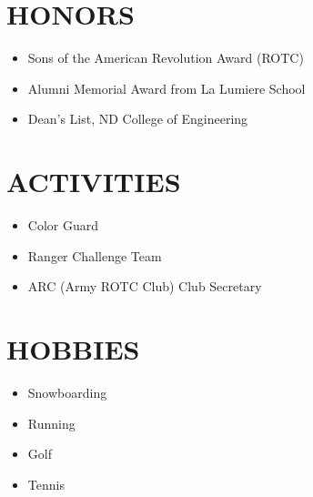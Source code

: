 \documentclass[11pt]{res} %
\begin{document}
\begin{resume}
\section{HONORS} 
 
\begin{itemize} \itemsep -2pt
	\item Sons of the American Revolution Award (ROTC) 
	\item Alumni Memorial Award from La Lumiere School
	\item Dean's List, ND College of Engineering
	
\end{itemize}
\section{ACTIVITIES} 
\begin{itemize} \itemsep -2pt
	\item Color Guard
	\item Ranger Challenge Team 
	\item ARC (Army ROTC Club) Club Secretary 
\end{itemize}
\section{HOBBIES} 
 \begin{itemize} \itemsep -2pt
	\item Snowboarding
	\item Running
	\item Golf
	\item Tennis
\end{itemize}


\end{resume}
\end{document}
